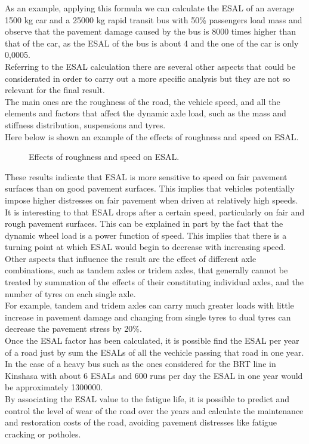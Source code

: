 \documentclass{article}
\begin{document}
As an example, applying this formula we can calculate the ESAL of an average 1500 kg car and a 25000 kg rapid transit bus with 50\% passengers load mass and observe that the pavement damage caused by the bus is 8000 times higher than that of the car, as the ESAL of the bus is about 4 and the one of the car is only 0,0005.\\
Referring to the ESAL calculation there are several other aspects that could be considerated in order to carry out a more specific analysis but they are not so relevant for the final result.\\
The main ones are the roughness of the road, the vehicle speed, and all the elements and factors that affect the dynamic axle load, such as the mass and stiffness distribution, suspensions and tyres.\\
Here below is shown an example of the effects of roughness and speed on ESAL.\\

\begin{figure}[H]
\centering
{}
\caption{Effects of roughness and speed on ESAL.}
\end{figure}

These results indicate that ESAL is more sensitive to speed on fair pavement surfaces than on good pavement surfaces. This implies that vehicles potentially impose higher distresses on fair pavement when driven at relatively high speeds.\\
It is interesting to that ESAL drops after a certain speed, particularly on fair and rough pavement surfaces. This can be explained in part by the fact that the dynamic wheel load is a power function of speed. This implies that there is a turning point at which ESAL would begin to decrease with increasing speed.\\
Other aspects that influence the result are the effect of different axle combinations, such as tandem axles or tridem axles, that generally cannot be treated by summation of the effects of their constituting individual axles, and the number of tyres on each single axle.\\
For example, tandem and tridem axles can carry much greater loads with little increase in pavement damage and changing from single tyres to dual tyres can decrease the pavement stress by 20\%.\\
Once the ESAL factor has been calculated, it is possible find the ESAL per year of a road just by sum the ESALs of all the vechicle passing that road in one year. In the case of a heavy bus such as the ones considered for the BRT line in Kinshasa with about 6 ESALs and 600 runs per day the ESAL in one year would be approximately 1300000.\\
By associating the ESAL value to the fatigue life, it is possible to predict and control the level of wear of the road over the years and calculate the maintenance and restoration costs of the road, avoiding pavement distresses like fatigue cracking or potholes.\cite{33}\cite{34}\cite{35}\cite{36}
\newpage
\end{document}
